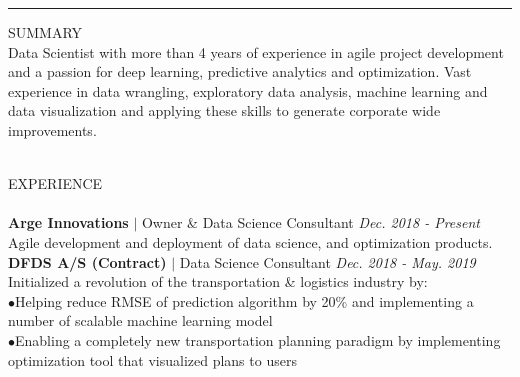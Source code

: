 \documentclass[10pt,a4paper]{article}
\newcommand{\headline}[1]{\Large \textcolor{myblue}{#1}}
\newcommand{\accomplishment}[1]{{\hspace*{-9pt}\textcolor{myblue}{$\bullet$}}\hspace*{4pt}\linespread{1.1}\footnotesize#1}
\begin{document}
\vspace{0.9cm}
\hrule height 0.4mm
\vspace{0.5cm}
{\headline{SUMMARY}}\\
Data Scientist with more than 4 years of experience in agile project development and a passion for deep learning, predictive analytics and optimization. Vast experience in data wrangling, exploratory data analysis, machine learning and data visualization and applying these skills to generate corporate wide improvements.\\
\vspace{0.3cm}
\\
  \begin{minipage}[t]{0.66\linewidth}
    {\headline{EXPERIENCE}}\\
    \vspace{-8pt}\\
    
    \textbf{Arge Innovations} $|$ Owner \& Data Science Consultant \hfill \textit{Dec. 2018 - Present} \\
    Agile development and deployment of data science, and optimization products.\\

    \normalsize \textbf{DFDS A/S (Contract)} $|$ Data Science Consultant \hfill \textit{Dec. 2018 - May. 2019} \\
        \footnotesize Initialized a revolution of the transportation \& logistics industry by:\\
        \accomplishment{Helping reduce RMSE of prediction algorithm by 20\% and implementing a number of scalable machine learning model}\\
        \accomplishment{Enabling a completely new transportation planning paradigm by implementing optimization tool that visualized plans to users}\\
    \\


\end{minipage}
\end{document}
